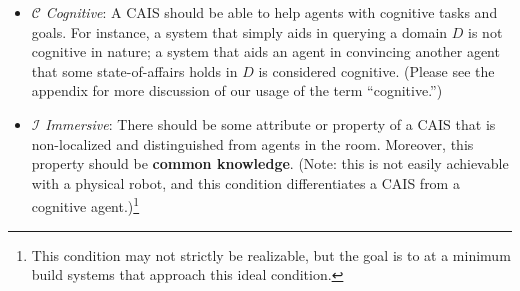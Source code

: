 \begin{itemize}
    \item $\mathcal{C}$ \emph{Cognitive}: A CAIS should be able to
      help agents with cognitive tasks and goals.  For instance, a
      system that simply aids in querying a domain $D$ is not
      cognitive in nature; a system that aids an agent in convincing
      another agent that some state-of-affairs holds in $D$ is
      considered cognitive. (Please see the appendix for more
      discussion of our usage of the term ``cognitive.'')
    \item $\mathcal{I}$ \emph{Immersive}:  There should
      be some attribute or property of a CAIS that is non-localized
      and distinguished from agents in the room.  Moreover, this
      property should be \textbf{common knowledge}.  (Note: this is
      not easily achievable with a physical robot, and this condition
      differentiates a CAIS from a cognitive
      agent.)\footnote{This condition may not strictly be realizable,
        but the goal is to at a minimum build systems that approach
        this ideal condition.}
\end{itemize}
